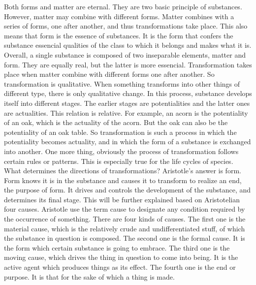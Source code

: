 \documentclass[11pt]{article}
\begin{document}
  Both forms and matter are eternal. They are two basic principle of substances. However, matter may combine with different forms. Matter combines with a series of forms, one after another, and thus transformations take place. This also means that form is the essence of substances. It is the form that confers the substance essencial qualities of the class to which it belongs and makes what it is. Overall, a single substance is composed of two inseparable elements, matter and form. They are equally real, but the latter is more essencial.
  Transformation takes place when matter combine with different forms one after another. So transformation is qualitative. When something transforms into other things of different type, there is only qualitative change. In this process, substance develops itself into different stages. The earlier stages are potentialities and the latter ones are actualities. This relation is relative. For example, an acorn is the potentiality of an oak, which is the actuality of the acorn. But the oak can also be the potentiality of an oak table. So transformation is such a process in which the potentiality becomes actuality, and in which the form of a substance is exchanged into another.
  One more thing, obviously the process of transformation follows certain rules or patterns. This is especially true for the life cycles of species. What determines the directions of transformations? Aristotle’s answer is form. Form knows it is in the substance and causes it to transform to realize an end, the purpose of form. It drives and controls the development of the substance, and determines its final stage. This will be further explained based on Aristotelian four causes. 
  Aristotle use the term cause to designate any condition required by the occurrence of something. There are four kinds of causes. The first one is the material cause, which is the relatively crude and undifferentiated stuff, of which the substance in question is composed. The second one is the formal cause. It is the form which certain substance is going to embrace. The third one is the moving cause, which drives the thing in question to come into being. It is the active agent which produces things as its effect. The fourth one is the end or purpose. It is that for the sake of which a thing is made.
\end{document}

